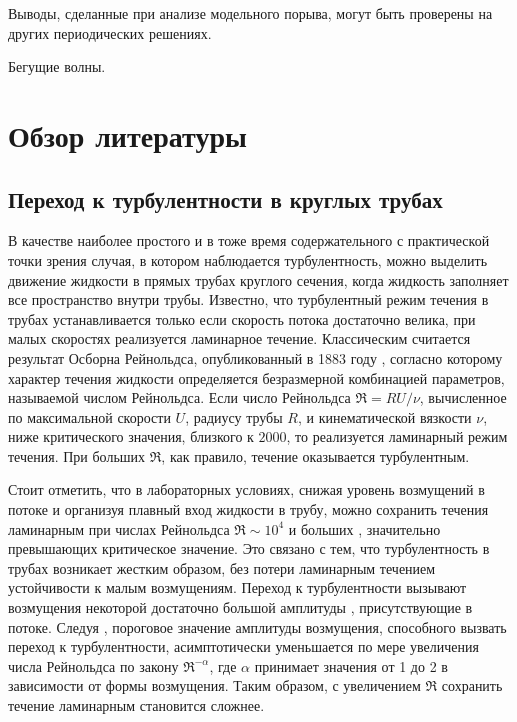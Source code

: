 Выводы, сделанные при анализе модельного порыва, могут быть проверены на других периодических решениях.

Бегущие волны.


\section{Обзор литературы}

	\subsection{Переход к турбулентности в круглых трубах}

В качестве наиболее простого и в тоже время содержательного с практической точки зрения случая, в котором наблюдается турбулентность, можно выделить движение жидкости в прямых трубах круглого сечения, когда жидкость заполняет все пространство внутри трубы. Известно, что турбулентный режим течения в трубах устанавливается только если скорость потока достаточно велика, при малых скоростях реализуется ламинарное течение. Классическим считается результат Осборна Рейнольдса, опубликованный в 1883 году \cite{Reynolds1883}, согласно которому характер течения жидкости определяется безразмерной комбинацией параметров, называемой числом Рейнольдса. Если число Рейнольдса $\Re = RU/\nu$, вычисленное по максимальной скорости $U$, радиусу трубы $R$, и кинематической вязкости $\nu$, ниже критического значения, близкого к $2000$, то реализуется ламинарный режим течения. При больших $\Re$, как правило, течение оказывается турбулентным. 

Стоит отметить, что в лабораторных условиях, снижая уровень возмущений в потоке и организуя плавный вход жидкости в трубу, можно сохранить течения ламинарным при числах Рейнольдса $\Re \sim 10^4$ и больших \cite{Wygnanski1973, Darbyshire1995, vanDoorne2009}, значительно превышающих критическое значение. Это связано с тем, что турбулентность в трубах возникает жестким образом, без потери ламинарным течением устойчивости к малым возмущениям. Переход к турбулентности вызывают возмущения некоторой достаточно большой амплитуды \cite{Grossmann2000}, присутствующие в потоке. Следуя \cite{Darbyshire1995, Hof2003, Peixinho2007, Mellibovsky2009critical}, пороговое значение амплитуды возмущения, способного вызвать переход к турбулентности, асимптотически уменьшается по мере увеличения числа Рейнольдса по закону $\Re^{-\alpha}$, где $\alpha$ принимает значения от 1 до 2 в зависимости от формы возмущения. Таким образом, с увеличением $\Re$ сохранить течение ламинарным становится сложнее. 

